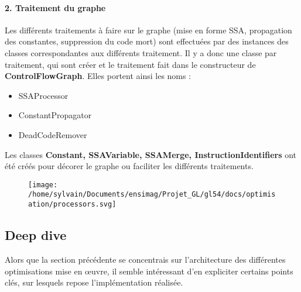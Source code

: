 \documentclass[
]{article}
\begin{document}
\hypertarget{2-traitement-du-graphe}{%
\paragraph{2. Traitement du graphe}\label{2-traitement-du-graphe}}

Les différents traitements à faire sur le graphe (mise en forme SSA,
propagation des constantes, suppression du code mort) sont effectuées
par des instances des classes correspondantes aux différents traitement.
Il y a donc une classe par traitement, qui sont créer et le traitement
fait dans le constructeur de \textbf{ControlFlowGraph}. Elles portent
ainsi les noms :

\begin{itemize}
\item
  SSAProcessor
\item
  ConstantPropagator
\item
  DeadCodeRemover
\end{itemize}

Les classes \textbf{Constant, SSAVariable, SSAMerge,
InstructionIdentifiers} ont été créés pour décorer le graphe ou
faciliter les différents traitements.

\begin{figure}
\centering
\texttt{[image: /home/sylvain/Documents/ensimag/Projet\_GL/gl54/docs/optimisation/processors.svg]}
\caption{}
\end{figure}

\hypertarget{deep-dive}{%
\subsection{\texorpdfstring{Deep dive }{Deep dive }}\label{deep-dive}}

Alors que la section précédente se concentrais sur l'architecture des
différentes optimisations mise en œuvre, il semble intéressant d'en
expliciter certains points clés, sur lesquels repose l'implémentation
réalisée.
\end{document}
